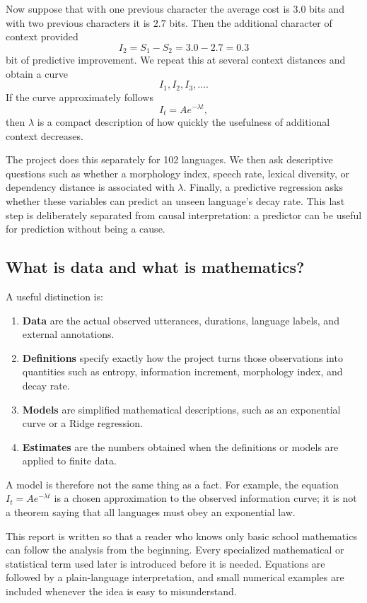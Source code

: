 \documentclass[11pt]{article}
\begin{document}
Now suppose that with one previous character the average cost is $3.0$ bits and with two previous characters it is $2.7$ bits. Then the additional character of context provided
\[
I_2=S_1-S_2=3.0-2.7=0.3
\]
bit of predictive improvement. We repeat this at several context distances and obtain a curve
\[
I_1,I_2,I_3,\ldots.
\]
If the curve approximately follows
\[
I_t=Ae^{-\lambda t},
\]
then $\lambda$ is a compact description of how quickly the usefulness of additional context decreases.

The project does this separately for 102 languages. We then ask descriptive questions such as whether a morphology index, speech rate, lexical diversity, or dependency distance is associated with $\lambda$. Finally, a predictive regression asks whether these variables can predict an unseen language's decay rate. This last step is deliberately separated from causal interpretation: a predictor can be useful for prediction without being a cause.

\subsection*{What is data and what is mathematics?}
A useful distinction is:
\begin{enumerate}
\item \textbf{Data} are the actual observed utterances, durations, language labels, and external annotations.
\item \textbf{Definitions} specify exactly how the project turns those observations into quantities such as entropy, information increment, morphology index, and decay rate.
\item \textbf{Models} are simplified mathematical descriptions, such as an exponential curve or a Ridge regression.
\item \textbf{Estimates} are the numbers obtained when the definitions or models are applied to finite data.
\end{enumerate}
A model is therefore not the same thing as a fact. For example, the equation $I_t=Ae^{-\lambda t}$ is a chosen approximation to the observed information curve; it is not a theorem saying that all languages must obey an exponential law.

This report is written so that a reader who knows only basic school mathematics can follow the analysis from the beginning. Every specialized mathematical or statistical term used later is introduced before it is needed. Equations are followed by a plain-language interpretation, and small numerical examples are included whenever the idea is easy to misunderstand.
\end{document}
